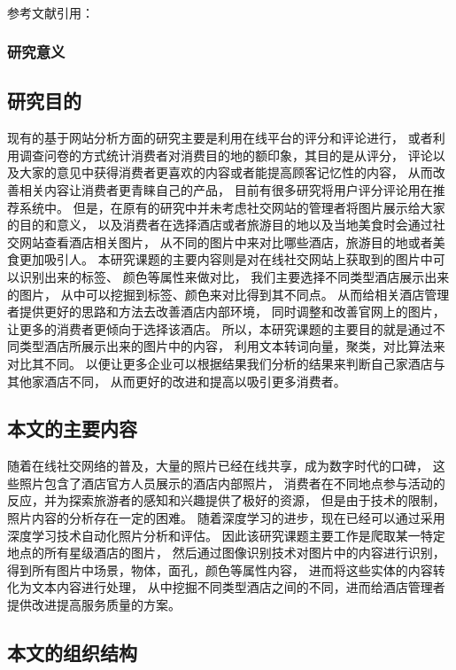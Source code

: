 \documentclass[cs4size,a4paper]{ctexart}
\numberwithin{equation}{section}
\numberwithin{table}{section}
\numberwithin{figure}{section}
\newcommand{\upcite}[1]{\textsuperscript{\textsuperscript{\cite{#1}}}}%
\begin{document}
参考文献引用：~\upcite{huang2008stock}


\subsubsection{研究意义}



\subsection{研究目的}

现有的基于网站分析方面的研究主要是利用在线平台的评分和评论进行，
或者利用调查问卷的方式统计消费者对消费目的地的额印象，其目的是从评分，
评论以及大家的意见中获得消费者更喜欢的内容或者能提高顾客记忆性的内容，
从而改善相关内容让消费者更青睐自己的产品，
目前有很多研究将用户评分评论用在推荐系统中。
但是，在原有的研究中并未考虑社交网站的管理者将图片展示给大家的目的和意义，
以及消费者在选择酒店或者旅游目的地以及当地美食时会通过社交网站查看酒店相关图片，
从不同的图片中来对比哪些酒店，旅游目的地或者美食更加吸引人。
本研究课题的主要内容则是对在线社交网站上获取到的图片中可以识别出来的标签、
颜色等属性来做对比，
我们主要选择不同类型酒店展示出来的图片，
从中可以挖掘到标签、颜色来对比得到其不同点。
从而给相关酒店管理者提供更好的思路和方法去改善酒店内部环境，
同时调整和改善官网上的图片，让更多的消费者更倾向于选择该酒店。
所以，本研究课题的主要目的就是通过不同类型酒店所展示出来的图片中的内容，
利用文本转词向量，聚类，对比算法来对比其不同。
以便让更多企业可以根据结果我们分析的结果来判断自己家酒店与其他家酒店不同，
从而更好的改进和提高以吸引更多消费者。

\subsection{本文的主要内容}

随着在线社交网络的普及，大量的照片已经在线共享，成为数字时代的口碑，
这些照片包含了酒店官方人员展示的酒店内部照片，
消费者在不同地点参与活动的反应，并为探索旅游者的感知和兴趣提供了极好的资源，
但是由于技术的限制，照片内容的分析存在一定的困难。
随着深度学习的进步，现在已经可以通过采用深度学习技术自动化照片分析和评估。
因此该研究课题主要工作是爬取某一特定地点的所有星级酒店的图片，
然后通过图像识别技术对图片中的内容进行识别，
得到所有图片中场景，物体，面孔，颜色等属性内容，
进而将这些实体的内容转化为文本内容进行处理，
从中挖掘不同类型酒店之间的不同，进而给酒店管理者提供改进提高服务质量的方案。

\subsection{本文的组织结构}
\end{document}
